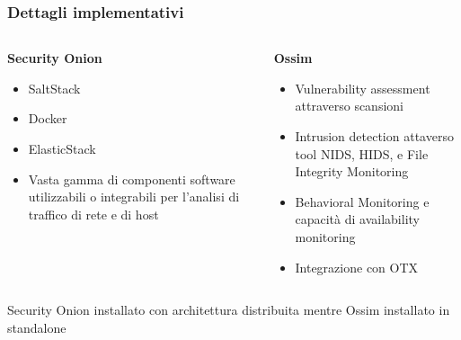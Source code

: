 \begin{frame}
    \frametitle{Dettagli implementativi}
    \begin{columns}[t]
        \centering
        \begin{column}{0.45\textwidth}
            \textbf{Security Onion}
            \begin{itemize}
                \item SaltStack
                \item Docker
                \item ElasticStack
                \item Vasta gamma di componenti software utilizzabili o integrabili per l'analisi di traffico di rete e di host
            \end{itemize}
        \end{column}
        \begin{column}{0.45\textwidth}
            \textbf{Ossim}
            \begin{itemize}
                \item Vulnerability assessment attraverso scansioni
                \item Intrusion detection attaverso tool NIDS, HIDS, e File Integrity Monitoring
                \item Behavioral Monitoring e capacità di availability monitoring
                \item Integrazione con OTX
            \end{itemize}
        \end{column}
    \end{columns}
    \bigskip
    Security Onion installato con architettura distribuita mentre Ossim installato in standalone
\end{frame}


